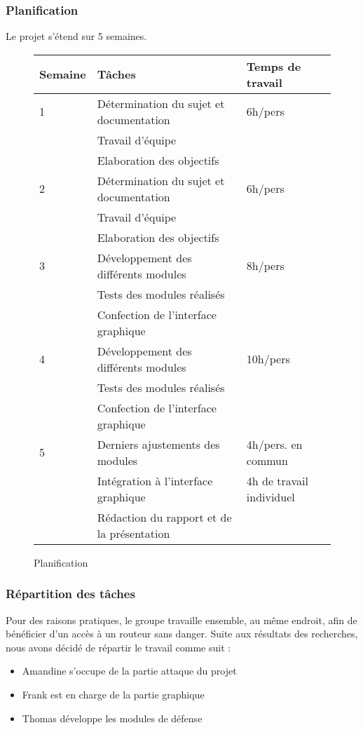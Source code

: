 \documentclass[11pt]{article}
\begin{document}
\subsubsection{Planification}
Le projet s'étend sur 5 semaines.~\\
\begin{figure}[h]
\centering
\begin{tabular}{|l|l|l|}
\hline
Semaine & Tâches & Temps de travail \\ \hline

1& Détermination du sujet et documentation  & 6h/pers \\
& Travail d'équipe & \\
& Elaboration des objectifs &  ~\\ \hline

2& Détermination du sujet et documentation  & 6h/pers \\
& Travail d'équipe & \\
& Elaboration des objectifs &  ~\\ \hline

3& Développement des différents modules & 8h/pers \\
& Tests des modules réalisés \\
& Confection de l'interface graphique ~\\ \hline

4& Développement des différents modules & 10h/pers \\
& Tests des modules réalisés \\
& Confection de l'interface graphique ~\\ \hline

5& Derniers ajustements des modules & 4h/pers. en commun \\
& Intégration à l'interface graphique & 4h de travail individuel \\
& Rédaction du rapport et de la présentation  \\ \hline
\end{tabular}
\caption{Planification}
\end{figure}




\subsubsection{Répartition des tâches}
Pour des raisons pratiques, le groupe travaille ensemble, au même endroit, afin de bénéficier d'un accès à un routeur sans danger.
Suite aux résultats des recherches, nous avons décidé de répartir le travail comme suit : 
\begin{itemize}
	\item Amandine s'occupe de la partie attaque du projet
	\item Frank est en charge de la partie graphique
	\item Thomas développe les modules de défense
\end{itemize}
\end{document}
